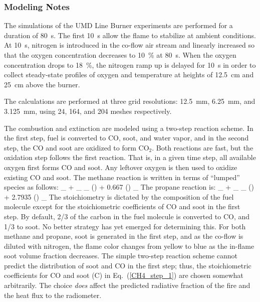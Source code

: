 \subsubsection{Modeling Notes}

The simulations of the UMD Line Burner experiments are performed for a duration of 80~s. The first 10~s allow the flame to stabilize at ambient conditions. At 10~s, nitrogen is introduced in the co-flow air stream and linearly increased so that the oxygen concentration decreases to 10~\% at 80~s. When the oxygen concentration drops to 18~\%, the nitrogen ramp up is delayed for 10~s in order to collect steady-state profiles of oxygen and temperature at heights of 12.5~cm and 25~cm above the burner.

The calculations are performed at three grid resolutions: 12.5~mm, 6.25~mm, and 3.125~mm, using 24, 164, and 204 meshes respectively.

The combustion and extinction are modeled using a two-step reaction scheme. In the first step, fuel is converted to CO, soot, and water vapor, and in the second step, the CO and soot are oxidized to form CO$_2$. Both reactions are fast, but the oxidation step follows the first reaction. That is, in a given time step, all available oxygen first forms CO and soot. Any leftover oxygen is then used to oxidize existing CO and soot. The methane reaction is written in terms of ``lumped'' species as follows:
\be
{}_ \; +  \; _ \longrightarrow
{}_ \label{CH4_step_1}
\ee
\be
() + 0.667 \; () \longrightarrow  {}_
\ee
The propane reaction is:
\be
{}_ \; +  \; _ \longrightarrow
{}_
\ee
\be
() + 2.7935 \; () \longrightarrow  {}_
\ee
The stoichiometry is dictated by the composition of the fuel molecule except for the stoichiometric coefficients of CO and soot in the first step. By default, 2/3 of the carbon in the fuel molecule is converted to CO, and 1/3 to soot. No better strategy has yet emerged for determining this. For both methane and propane, soot is generated in the first step, and as the co-flow is diluted with nitrogen, the flame color changes from yellow to blue as the in-flame soot volume fraction decreases. The simple two-step reaction scheme cannot predict the distribution of soot and CO in the first step; thus, the stoichiometric coefficients for CO and soot (C) in Eq.~(\ref{CH4_step_1}) are chosen somewhat arbitrarily. The choice {\em does} affect the predicted radiative fraction of the fire and the heat flux to the radiometer.

